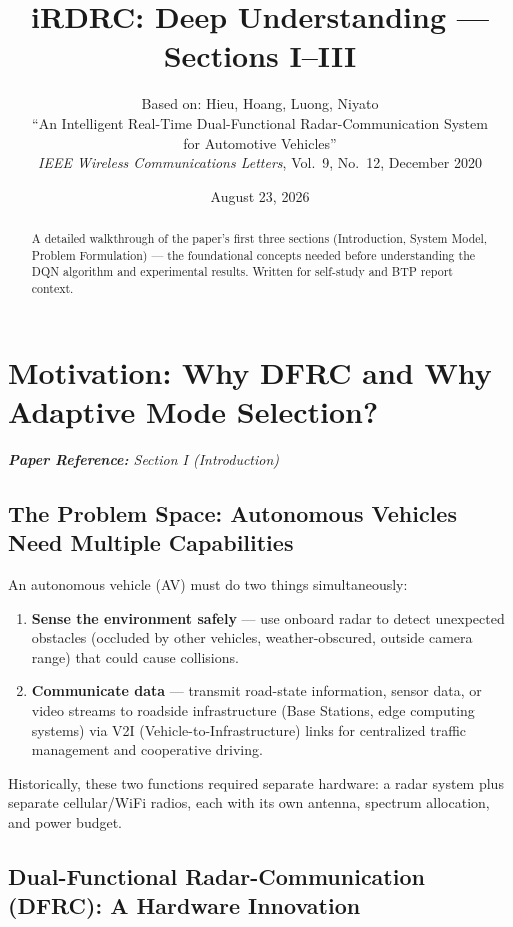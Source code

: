 \documentclass[12pt,a4paper]{article}
\title{iRDRC: Deep Understanding --- Sections I--III}
\author{Based on: Hieu, Hoang, Luong, Niyato\\
``An Intelligent Real-Time Dual-Functional Radar-Communication System\\
for Automotive Vehicles''\\
\textit{IEEE Wireless Communications Letters}, Vol.~9, No.~12, December 2020}
\date{August 23, 2026}
\begin{document}
\maketitle

\begin{abstract}
A detailed walkthrough of the paper's first three sections (Introduction, System Model, Problem Formulation) --- the foundational concepts needed before understanding the DQN algorithm and experimental results. Written for self-study and BTP report context.
\end{abstract}

\tableofcontents
\newpage

\section{Motivation: Why DFRC and Why Adaptive Mode Selection?}

\noindent\textit{\textbf{Paper Reference:} Section I (Introduction)}

\subsection{The Problem Space: Autonomous Vehicles Need Multiple Capabilities}

An autonomous vehicle (AV) must do two things simultaneously:
\begin{enumerate}
    \item \textbf{Sense the environment safely} --- use onboard radar to detect unexpected obstacles (occluded by other vehicles, weather-obscured, outside camera range) that could cause collisions.
    \item \textbf{Communicate data} --- transmit road-state information, sensor data, or video streams to roadside infrastructure (Base Stations, edge computing systems) via V2I (Vehicle-to-Infrastructure) links for centralized traffic management and cooperative driving.
\end{enumerate}

Historically, these two functions required separate hardware: a radar system plus separate cellular/WiFi radios, each with its own antenna, spectrum allocation, and power budget.

\subsection{Dual-Functional Radar-Communication (DFRC): A Hardware Innovation}
\end{document}
